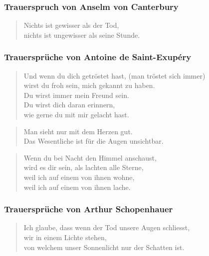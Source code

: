 \documentclass[ngerman,a4paper,11pt]{scrreprt}
\begin{document}
\subsubsection*{Trauerspruch von Anselm von Canterbury}
\label{sec-1-1-1-3-3}

\begin{verse}
Nichts ist gewisser als der Tod, \\
nichts ist ungewisser als seine Stunde. \\
\end{verse}

\subsubsection*{Trauersprüche von Antoine de Saint-Exupéry}
\label{sec-1-1-1-3-4}

\begin{verse}
Und wenn du dich getröstet hast, (man tröstet sich immer) \\
wirst du froh sein, mich gekannt zu haben. \\
Du wirst immer mein Freund sein. \\
Du wirst dich daran erinnern, \\
wie gerne du mit mir gelacht hast. \\
\end{verse}

\begin{verse}
Man sieht nur mit dem Herzen gut. \\
Das Wesentliche ist für die Augen unsichtbar. \\
\end{verse}

\begin{verse}
Wenn du bei Nacht den Himmel anschaust, \\
wird es dir sein, als lachten alle Sterne, \\
weil ich auf einem von ihnen wohne, \\
weil ich auf einem von ihnen lache. \\
\end{verse}

\subsubsection*{Trauersprüche von Arthur Schopenhauer}
\label{sec-1-1-1-3-5}

\begin{verse}
Ich glaube, dass wenn der Tod unsere Augen schliesst, \\
wir in einem Lichte stehen, \\
von welchem unser Sonnenlicht nur der Schatten ist. \\
\end{verse}
\end{document}

